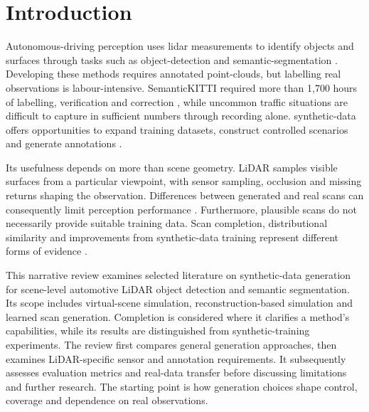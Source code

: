 \section{Introduction}
\label{sec:introduction}

Autonomous-driving perception uses \gls{lidar} measurements to identify
objects and surfaces through tasks such as \gls{object-detection} and
\gls{semantic-segmentation}
\parencite{geigerAreWeReady2012,behleySemanticKITTIDatasetSemantic2019}.
Developing these methods requires annotated \glspl{point-cloud}, but
labelling real observations is labour-intensive. SemanticKITTI required
more than 1,700 hours of labelling, verification and correction
\parencite{behleySemanticKITTIDatasetSemantic2019}, while uncommon traffic
situations are difficult to capture in sufficient numbers through recording alone.
\Gls{synthetic-data} offers opportunities to expand training datasets,
construct controlled scenarios and generate annotations
\parencite{hurlPreciseSyntheticImage2019,xiaoTransferLearningSynthetic2022}.

Its usefulness depends on more than scene geometry. LiDAR samples visible
surfaces from a particular viewpoint, with sensor sampling, \gls{occlusion}
and missing returns shaping the observation. Differences between generated
and real scans can consequently limit perception performance
\parencite{manivasagamLiDARsimRealisticLiDAR2020}.
Furthermore, plausible scans do not necessarily provide suitable training
data. Scan completion, distributional similarity and improvements from
synthetic-data training represent different forms of evidence
\parencite{zyrianovLearningGenerateRealistic2022,xiaoTransferLearningSynthetic2022}.

This narrative review examines selected literature on synthetic-data
generation for scene-level automotive LiDAR object detection and semantic
segmentation. Its scope includes virtual-scene simulation,
reconstruction-based simulation and learned scan generation. Completion
is considered where it clarifies a method's capabilities, while its
results are distinguished from synthetic-training experiments.
The review first compares general generation approaches, then examines
LiDAR-specific sensor and annotation requirements. It subsequently assesses
evaluation metrics and real-data transfer before discussing limitations
and further research. The starting point is how generation choices shape
control, coverage and dependence on real observations.
